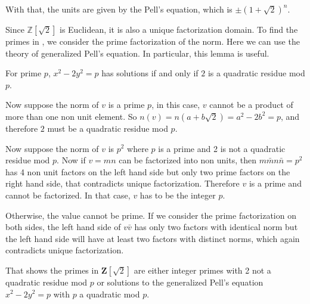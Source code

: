 \documentclass{article}
\begin{document}
With that, the units are given by the Pell's equation, which is $ \pm(1+\sqrt{2})^n $.

Since $ \mathbb{Z}[\sqrt{2}] $ is Euclidean, it is also a unique factorization domain. To find the primes in , we consider the prime factorization of the norm. Here we can use the theory of generalized Pell's equation. In particular, this lemma is useful.

For prime $ p $, $ x^2 - 2y^2 = p $ has solutions if and only if $ 2 $ is a quadratic residue mod $ p $.

Now suppose the norm of $ v $ is a prime $ p $, in this case, $ v $ cannot be a product of more than one non unit element. So $ n(v) = n(a + b\sqrt{2}) = a^2 - 2b^2 = p $, and therefore $ 2 $ must be a quadratic residue mod $ p $.

Now suppose the norm of $ v $ is $ p^2 $ where $ p $ is a prime and 2 is not a quadratic residue mod $ p $. Now if $ v = mn $ can be factorized into non units, then $ m\bar{m}n\bar{n} = p^2 $ has 4 non unit factors on the left hand side but only two prime factors on the right hand side, that contradicts unique factorization. Therefore $ v $ is a prime and cannot be factorized. In that case, $ v $ has to be the integer $ p $.

Otherwise, the value cannot be prime. If we consider the prime factorization on both sides, the left hand side of $ v\bar{v} $ has only two factors with identical norm but the left hand side will have at least two factors with distinct norms, which again contradicts unique factorization.

That shows the primes in $ \mathbf{Z}[\sqrt{2}] $ are either integer primes with 2 not a quadratic residue mod $ p $ or solutions to the generalized Pell's equation $ x^2 - 2y^2 = p $ with $ p $ a quadratic mod $ p $.
\end{document}
